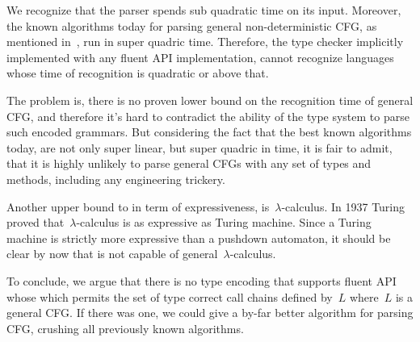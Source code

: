 We recognize that the \Java parser spends sub quadratic time
  on its input.
Moreover, the known algorithms today for parsing general 
  non-deterministic CFG, as mentioned in~, run in 
  super quadric time.
Therefore,
  the type checker implicitly implemented with any fluent API implementation,
  cannot recognize languages whose time of recognition is quadratic or above that.

The problem is, there is no proven lower bound on the recognition time of general CFG,
  and therefore it's hard to contradict the ability of the type system to parse such 
  encoded grammars.
But considering the fact that the best known algorithms today, 
  are not only super linear, but super quadric in time,
  it is fair to admit, that it is highly unlikely to parse general CFGs
  with any set of \Java types and methods, including any engineering trickery.

Another upper bound to \Self in term of expressiveness, is~$\lambda$-calculus.
In 1937 Turing~\cite{Turing:37} proved that~$\lambda$-calculus is as expressive as Turing machine.
Since a Turing machine is strictly more expressive than a pushdown automaton, 
  it should be clear by now that \Self is not capable of general~$\lambda$-calculus.


To conclude, we argue that there is no type encoding that supports fluent API whose
  which permits the set of type correct call chains defined by~$L$ where~$L$ is a general CFG. 
If there was one, we could give a by-far better algorithm for parsing CFG,
  crushing all previously known algorithms.
